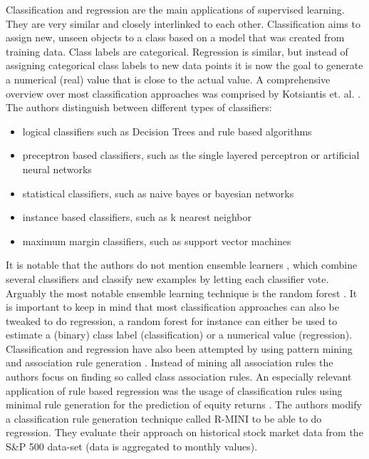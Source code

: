 Classification and regression are the main applications of supervised learning. They are very similar and closely interlinked to each other. Classification aims to assign new, unseen objects to a class based on a model that was created from training data. Class labels are categorical. Regression is similar, but instead of assigning categorical class labels to new data points it is now the goal to generate a numerical (real) value that is close to the actual value. 
A comprehensive overview over most classification approaches was comprised by Kotsiantis et. al. \cite{kotsiantis2007supervised}. The authors distinguish between different types of classifiers:
\begin{itemize}
	\item logical classifiers such as Decision Trees and rule based algorithms
	\item preceptron based classifiers, such as the single layered perceptron or artificial neural networks
	\item statistical classifiers, such as naive bayes or bayesian networks
	\item instance based classifiers, such as k nearest neighbor
	\item maximum margin classifiers, such as support vector machines
\end{itemize}
It is notable that the authors do not mention ensemble learners \cite{dietterich2000ensemble}, which combine several classifiers and classify new examples by letting each classifier vote. Arguably the most notable ensemble learning technique is the random forest \cite{liaw2002classification}.
It is important to keep in mind that most classification approaches can also be tweaked to do regression, a random forest for instance can either be used to estimate a (binary) class label (classification) or a numerical value (regression).
Classification and regression have also been attempted by using pattern mining and association rule generation \cite{ma1998integrating}. Instead of mining all association rules the authors focus on finding so called class association rules. An especially relevant application of rule based regression was the usage of classification rules using minimal rule generation for the prediction of equity returns \cite{apte1994predicting}. The authors modify a classification rule generation technique called R-MINI to be able to do regression. They evaluate their approach on historical stock market data from the S\&P 500 data-set (data is aggregated to monthly values). 

